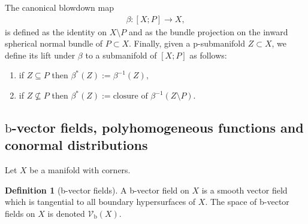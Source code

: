 \documentclass[11pt]{article}
\newcommand{\Subsection}{\subsection}
\numberwithin{equation}{section}
\let\backslash\setminus
\theoremstyle{plain}
\theoremstyle{definition}
\newtheorem{defn}[Th]{Definition}
\newcommand{\bb}{{\mathrm{b}}}
\begin{document}
The canonical blowdown map
\begin{align*}
\beta: [ X; P] \to X,
\end{align*}
is defined as the identity on $X\backslash P$ and as
the bundle projection on the inward spherical normal bundle of $P \subset X$.
Finally, given a p-submanifold $Z\subset X$, we define its
lift under $\beta$ to a submanifold of $[ X; P]$ as follows:
\begin{enumerate}
\item if $Z \subseteq P$ then $\beta^{*}(Z) := \beta^{-1}(Z),$
\item if $Z \nsubseteq P$ then $\beta^{*}(Z) := \text{closure of \ }
\beta^{-1}(Z \backslash P)$.
\end{enumerate}

\Subsection{\texorpdfstring{$\bb$}{b}-vector fields, polyhomogeneous functions and conormal distributions}
Let $X$ be a manifold with corners.
\begin{defn}[b-vector fields]
A b-vector field on $X$ is a smooth vector field which is tangential to all boundary hypersurfaces of $X$.
The space of b-vector fields on $X$ is denoted $\mathcal{V}_\bb(X)$.
\end{defn}
\end{document}
